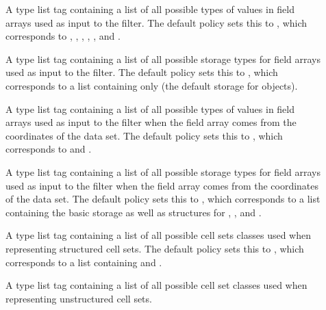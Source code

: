 \begin{description}
\item[] 
  A type list tag containing a list of all possible types of values in field arrays used as input to the filter.
  The default policy sets this to , which corresponds to , , , , , and .
\item[] 
  A type list tag containing a list of all possible storage types for field arrays used as input to the filter.
  The default policy sets this to , which corresponds to a list containing only  (the default storage for  objects).
\item[] 
  A type list tag containing a list of all possible types of values in field arrays used as input to the filter when the field array comes from the coordinates of the data set.
  The default policy sets this to , which corresponds to  and .
\item[] 
  A type list tag containing a list of all possible storage types for field arrays used as input to the filter when the field array comes from the coordinates of the data set.
  The default policy sets this to , which corresponds to a list containing the basic  storage as well as structures for , , and .
\item[] 
  A type list tag containing a list of all possible cell sets classes used when representing structured cell sets.
  The default policy sets this to , which corresponds to a list containing  and .
\item[] 
  A type list tag containing a list of all possible cell set classes used when representing unstructured cell sets.

\end{description}
